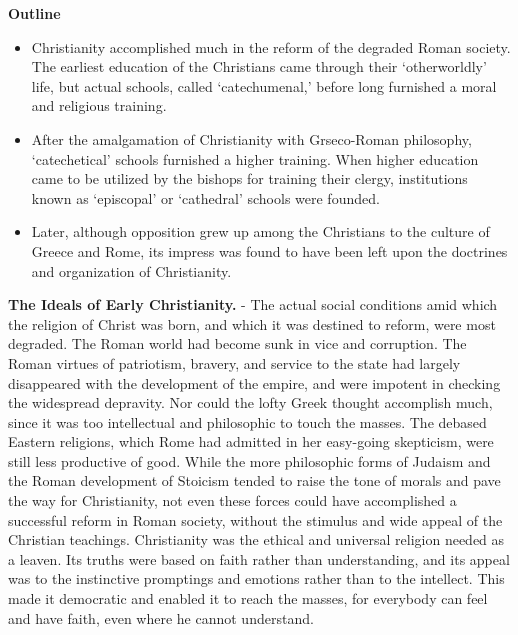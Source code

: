 \documentclass[
]{book}
\providecommand{\tightlist}{%
  \setlength{\itemsep}{0pt}\setlength{\parskip}{0pt}}
\begin{document}
\textbf{Outline}

\begin{itemize}
\tightlist
\item
  Christianity accomplished much in the reform of the degraded Roman society. The earliest education of the Christians came through their `otherworldly' life, but actual schools, called `catechumenal,' before long furnished a moral and religious training.
\item
  After the amalgamation of Christianity with Grseco-Roman philosophy, `catechetical' schools furnished a higher training. When higher education came to be utilized by the bishops for training their clergy, institutions known as `episcopal' or `cathedral' schools were founded.
\item
  Later, although opposition grew up among the Christians to the culture of Greece and Rome, its impress was found to have been left upon the doctrines and organization of Christianity.
\end{itemize}

\textbf{The Ideals of Early Christianity.} - The actual social conditions amid which the religion of Christ was born, and which it was destined to reform, were most degraded. The Roman world had become sunk in vice and corruption. The Roman virtues of patriotism, bravery, and service to the state had largely disappeared with the development of the empire, and were impotent in checking the widespread depravity. Nor could the lofty Greek thought accomplish much, since it was too intellectual and philosophic to touch the masses. The debased Eastern religions, which Rome had admitted in her easy-going skepticism, were still less productive of good. While the more philosophic forms of Judaism and the Roman development of Stoicism tended to raise the tone of morals and pave the way for Christianity, not even these forces could have accomplished a successful reform in Roman society, without the stimulus and wide appeal of the Christian teachings. Christianity was the ethical and universal religion needed as a leaven. Its truths were based on faith rather than understanding, and its appeal was to the instinctive promptings and emotions rather than to the intellect. This made it democratic and enabled it to reach the masses, for everybody can feel and have faith, even where he cannot understand.
\end{document}
